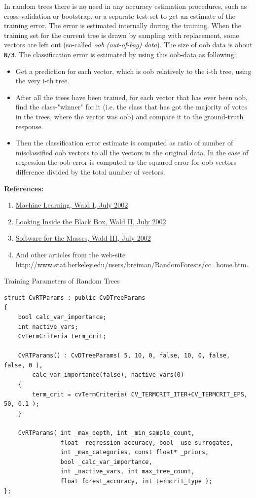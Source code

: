 In random trees there is no need in any accuracy estimation procedures, such as cross-validation or bootstrap, or a separate test set to get an estimate of the training error. The error is estimated internally during the training. When the training set for the current tree is drawn by sampling with replacement, some vectors are left out (so-called \emph{oob (out-of-bag) data}). The size of oob data is about \texttt{N/3}. The classification error is estimated by using this oob-data as following:
\begin{itemize}
\item{Get a prediction for each vector, which is oob relatively to the i-th tree, using the very i-th tree.}
\item{After all the trees have been trained, for each vector that has ever been oob, find the class-"winner" for it (i.e. the class that has got the majority of votes in the trees, where the vector was oob) and compare it to the ground-truth response.}
\item{Then the classification error estimate is computed as ratio of number of misclassified oob vectors to all the vectors in the original data. In the case of regression the oob-error is computed as the squared error for oob vectors difference divided by the total number of vectors.}
\end{itemize}

\textbf{References:}
\begin{enumerate}
\item{\href{http://stat-www.berkeley.edu/users/breiman/wald2002-1.pdf}{Machine Learning, Wald I, July 2002}}
\item{\href{http://stat-www.berkeley.edu/users/breiman/wald2002-2.pdf}{Looking Inside the Black Box, Wald II, July 2002 }}
\item{\href{http://stat-www.berkeley.edu/users/breiman/wald2002-3.pdf}{Software for the Masses, Wald III, July 2002 }}
\item{And other articles from the web-site \url{http://www.stat.berkeley.edu/users/breiman/RandomForests/cc_home.htm}.}
\end{enumerate}


Training Parameters of Random Trees

\begin{lstlisting}
struct CvRTParams : public CvDTreeParams
{
    bool calc_var_importance;
    int nactive_vars;
    CvTermCriteria term_crit;

    CvRTParams() : CvDTreeParams( 5, 10, 0, false, 10, 0, false, false, 0 ),
        calc_var_importance(false), nactive_vars(0)
    {
        term_crit = cvTermCriteria( CV_TERMCRIT_ITER+CV_TERMCRIT_EPS, 50, 0.1 );
    }

    CvRTParams( int _max_depth, int _min_sample_count,
                float _regression_accuracy, bool _use_surrogates,
                int _max_categories, const float* _priors,
                bool _calc_var_importance,
                int _nactive_vars, int max_tree_count,
                float forest_accuracy, int termcrit_type );
};
\end{lstlisting}

